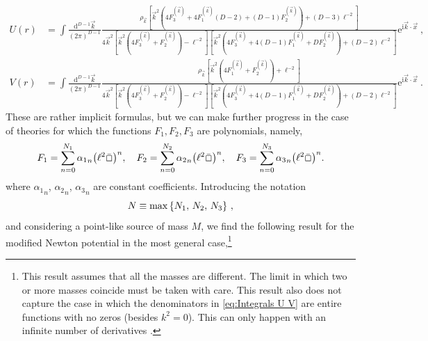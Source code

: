 \documentclass[11pt]{article}
\newcommand{\rmi}{\mathrm i}
\newcommand{\rme}{\mathrm e}
\newcommand{\rmd}{\mathrm d}
\begin{document}
\begin{equation}\label{eq:Integrals U V}
    \begin{aligned}
    U(r)&=\int\tfrac{\rmd^{D-1}\vec{k}}{(2\pi)^{D-1}}
   \tfrac{\rho_{\vec{k}}  \left[\vec{k}^2 \left(4F^{(\vec{k})}_3+4 F^{(\vec{k})}_1 (D-2)+(D-1)F^{(\vec{k})}_2\right)+(D-3)\ell^{-2}\right]}{4 \vec{k}^2 \left[\vec{k}^2
   \left(4F^{(\vec{k})}_3+F^{(\vec{k})}_2\right)-\ell^{-2}\right] \left[\vec{k}^2 \left(4F^{(\vec{k})}_3+4(D-1)F^{(\vec{k})}_1 +DF^{(\vec{k})}_2\right)+(D-2)\ell^{-2} \right]} \rme^{\rmi\vec{k}\cdot\vec{x}}~, \\
    V(r)&=\int\tfrac{\rmd^{D-1}\vec{k}}{(2\pi)^{D-1}}\tfrac{\rho_{\vec{k}}  \left[\vec{k}^2 \left(4 F^{(\vec{k})}_1+F^{(\vec{k})}_2\right)+\ell^{-2}\right]}{4 \vec{k}^2 \left[\vec{k}^2 \left(4F^{(\vec{k})}_3+F^{(\vec{k})}_2\right)-\ell^{-2}\right]
   \left[\vec{k}^2 \left(4F^{(\vec{k})}_3+4(D-1)F^{(\vec{k})}_1+DF^{(\vec{k})}_2\right)+(D-2)\ell^{-2}\right]}\rme^{\rmi\vec{k}\cdot\vec{x}}~.
\end{aligned}
\end{equation}
These are rather implicit formulas, but we can make further progress in the case of theories for which the functions $F_1,F_2,F_3$ are polynomials, namely,
\begin{equation}\label{eq:Nabla expansion}
    F_1=\sum_{n=0}^{N_1} {\alpha_1}_n\qty(\ell^2\bar\Box)^n,\quad F_2=\sum_{n=0}^{N_2} {\alpha_2}_n\qty(\ell^2\bar\Box)^n,\quad F_3=\sum_{n=0}^{N_3} {\alpha_3}_n\qty(\ell^2\bar\Box)^n.
\end{equation}
where ${\alpha_1}_n$, ${\alpha_2}_n$, ${\alpha_3}_n$ are constant coefficients. Introducing the notation
\begin{equation}
    N\equiv\max\qty{N_1,\,N_2,\,N_3}~,
\end{equation}
and considering a point-like source of mass $M$, we find the following result for the modified Newton potential in the most general case,\footnote{This result assumes that all the masses are different. The limit in which two or more masses coincide must be taken with care. This result also does not capture the case in which the denominators in \eqref{eq:Integrals U V} are entire functions with no zeros (besides $k^2=0$). This can only happen with an infinite number of derivatives \cite{Biswas:2011ar}.}
\end{document}
